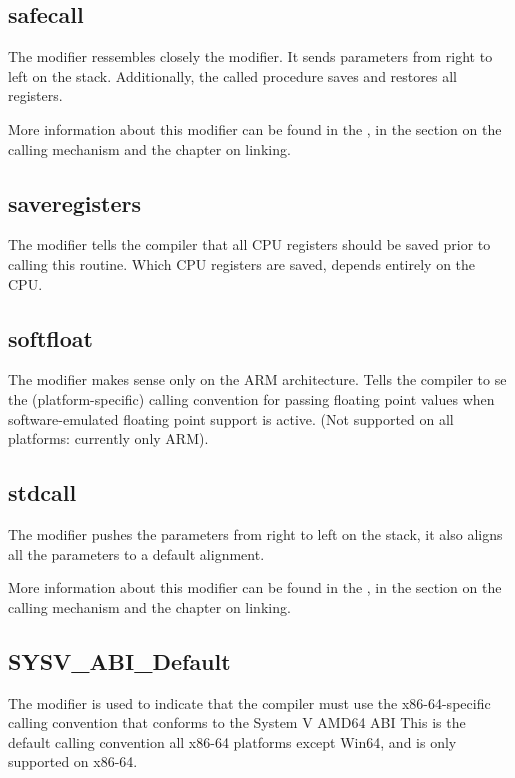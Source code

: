 \subsection{safecall}
The  modifier ressembles closely the  modifier.
It sends parameters from right to left on the stack. Additionally, the
called procedure saves and restores all registers.

More information about this modifier can be found in the \progref, in the
section on the calling mechanism and the chapter on linking.

\subsection{saveregisters}
The  modifier tells the compiler that all CPU registers should be
saved prior to calling this routine. Which CPU registers are saved, depends
entirely on the CPU.

\subsection{softfloat}
The   modifier makes sense only on the ARM architecture.
Tells the compiler to se the (platform-specific) calling convention for passing floating
point values when software-emulated floating point support is active.
(Not supported on all platforms: currently only ARM).


\subsection{stdcall}
The  modifier pushes the parameters from right to left on the stack,
it also aligns all the parameters to a default alignment.

More information about this modifier can be found in the \progref, in the
section on the calling mechanism and the chapter on linking.

\subsection{SYSV\_ABI\_Default}
The  modifier is used to indicate that the compiler must
use the x86-64-specific calling convention that conforms to the System V AMD64
ABI
This is the default calling convention all x86-64 platforms except Win64, 
and is only supported on x86-64.


